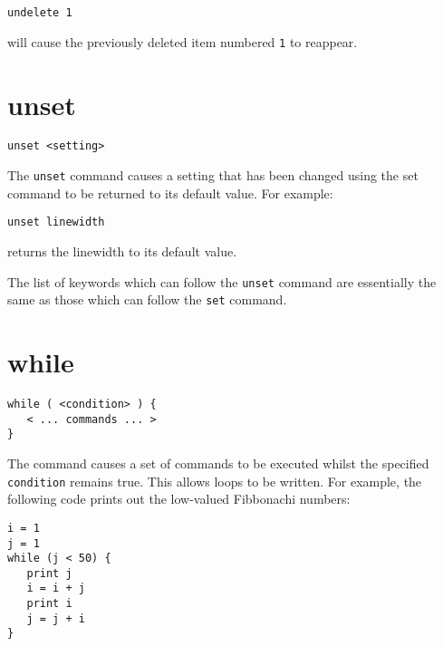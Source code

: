 \begin{verbatim}
undelete 1
\end{verbatim}

\noindent will cause the previously deleted item numbered {\tt 1} to reappear.
  
\section{unset}

\begin{verbatim}
unset <setting>
\end{verbatim}

The {\tt unset} command causes a setting that has been changed using the set
command to be returned to its default value.  For example:

\begin{verbatim}
unset linewidth
\end{verbatim}

\noindent returns the linewidth to its default value.

The list of keywords which can follow the {\tt unset} command are essentially
the same as those which can follow the {\tt set} command.

\section{while}

\begin{verbatim}
while ( <condition> ) {
   < ... commands ... >
}
\end{verbatim}

The  command causes a set of commands to be executed whilst the
specified {\tt condition} remains true.  This allows loops to be written.  For
example, the following code prints out the low-valued Fibbonachi numbers:

\begin{verbatim}
i = 1
j = 1
while (j < 50) {
   print j
   i = i + j
   print i
   j = j + i
}
\end{verbatim}
